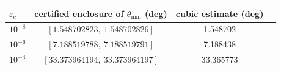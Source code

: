 \begin{tabular}{lccc}
\toprule
$\varepsilon_c$ & certified enclosure of $\theta_{\min}$ (deg) & cubic estimate (deg) \\
\midrule
$10^{-8}$ & $[1.548702823,\ 1.548702826]$ & 1.548702 \\
$10^{-6}$ & $[7.188519788,\ 7.188519791]$ & 7.188438 \\
$10^{-4}$ & $[33.373964194,\ 33.373964197]$ & 33.365773 \\
\bottomrule
\end{tabular}
